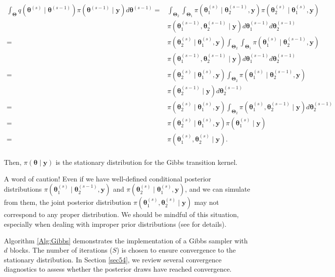 \begin{align*}
	\int_{\bm{\Theta}}q(\bm{\theta}^{(s)}\mid \bm{\theta}^{(s-1)})\pi(\bm{\theta}^{(s-1)}\mid \bm{y})d\bm{\theta}^{(s-1)}
	=&\int_{\bm{\Theta}_2}\int_{\bm{\Theta}_1}\pi(\bm{\theta}_1^{(s)}\mid \bm{\theta}_2^{(s-1)},\bm{y})\pi(\bm{\theta}_2^{(s)}\mid \bm{\theta}_1^{(s)},\bm{y})\\
	&\pi(\bm{\theta}^{(s-1)}_1,\bm{\theta}^{(s-1)}_2\mid \bm{y})d\bm{\theta}^{(s-1)}_1d\bm{\theta}^{(s-1)}_2\\
	=&\pi(\bm{\theta}_2^{(s)}\mid \bm{\theta}_1^{(s)},\bm{y})\int_{\bm{\Theta}_2}\int_{\bm{\Theta}_1}\pi(\bm{\theta}_1^{(s)}\mid \bm{\theta}_2^{(s-1)},\bm{y})\\
	&\pi(\bm{\theta}^{(s-1)}_1,\bm{\theta}^{(s-1)}_2\mid \bm{y})d\bm{\theta}^{(s-1)}_1d\bm{\theta}^{(s-1)}_2\\
	=&\pi(\bm{\theta}_2^{(s)}\mid \bm{\theta}_1^{(s)},\bm{y})\int_{\bm{\Theta}_2}\pi(\bm{\theta}_1^{(s)}\mid \bm{\theta}_2^{(s-1)},\bm{y})\\
	&\pi(\bm{\theta}^{(s-1)}_2\mid \bm{y})d\bm{\theta}^{(s-1)}_2\\
	=&\pi(\bm{\theta}_2^{(s)}\mid \bm{\theta}_1^{(s)},\bm{y})\int_{\bm{\Theta}_2}\pi(\bm{\theta}_1^{(s)},\bm{\theta}_2^{(s-1)}\mid \bm{y})d\bm{\theta}^{(s-1)}_2\\
	=&\pi(\bm{\theta}_2^{(s)}\mid \bm{\theta}_1^{(s)},\bm{y})\pi(\bm{\theta}_1^{(s)}\mid \bm{y})\\
	=&\pi(\bm{\theta}_1^{(s)},\bm{\theta}_2^{(s)}\mid \bm{y}).\\
\end{align*}

Then, $\pi(\bm{\theta}\mid \bm{y})$ is the stationary distribution for the Gibbs transition kernel.

A word of caution! Even if we have well-defined conditional posterior distributions $\pi(\bm{\theta}_1^{(s)} \mid  \bm{\theta}_2^{(s-1)}, \bm{y})$ and $\pi(\bm{\theta}_2^{(s)} \mid  \bm{\theta}_1^{(s)}, \bm{y})$, and we can simulate from them, the joint posterior distribution $\pi(\bm{\theta}_1^{(s)}, \bm{\theta}_2^{(s)} \mid  \bm{y})$ may not correspond to any proper distribution. We should be mindful of this situation, especially when dealing with improper prior distributions (see \cite[Chap.~10]{robert2011monte} for details).

Algorithm \ref{Alg:Gibbs} demonstrates the implementation of a Gibbs sampler with $d$ blocks. The number of iterations ($S$) is chosen to ensure convergence to the stationary distribution. In Section \ref{sec54}, we review several convergence diagnostics to assess whether the posterior draws have reached convergence.

